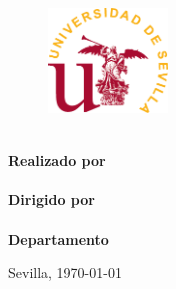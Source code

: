 
\begin{titlepage}
\begin{figure}[t]
	\centering
	\includegraphics[keepaspectratio, width=120px]{img/logoUS.pdf}
\end{figure}

\begin{center}
\large

\bigskip
{\MakeUppercase{\Facultad}}
\bigskip\\
\MakeUppercase{\Titulacion}
\vfill
{\bfseries\Large \Titulo}
\vfill
\textbf{Realizado por}\\
\Autor
\bigskip\\
\textbf{Dirigido por}\\
\Tutor
\bigskip\\
\textbf{Departamento}\\
\Departamento
\end{center}

\vfill
\begin{flushright}
	Sevilla, \titledate\today
\end{flushright}

\end{titlepage}
